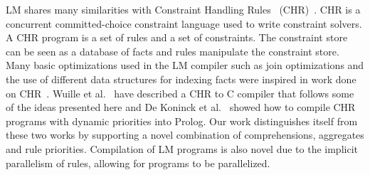 
LM shares many similarities with Constraint Handling Rules~
(CHR)~\cite{Betz:2005kx,DBLP:journals/corr/abs-1006-3039}.  CHR is a concurrent
committed-choice constraint language used to write constraint solvers. A CHR
program is a set of rules and a set of constraints.  The constraint store can be
seen as a database of facts and rules manipulate the constraint store. Many
basic optimizations used in the LM compiler such as join optimizations and the
use of different data structures for indexing facts were inspired in work done
on CHR~\cite{DBLP:journals/corr/cs-PL-0408025}.  Wuille et al.~\cite{42866} have
described a CHR to C compiler that follows some of the ideas presented here and
De Koninck et al.~\cite{chrp} showed how to compile CHR programs with dynamic
priorities into Prolog. Our work distinguishes itself from these two works by
supporting a novel combination of comprehensions, aggregates and rule
priorities. Compilation of LM programs is also novel due to the implicit
parallelism of rules, allowing for programs to be parallelized.
